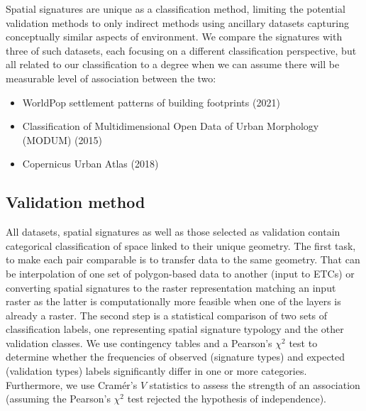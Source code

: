 Spatial signatures are unique as a classification method, limiting the potential
validation methods to only indirect methods using ancillary datasets capturing
conceptually similar aspects of environment. We compare the signatures with three of
such datasets, each focusing on a different classification perspective, but all related
to our classification to a degree when we can assume there will be measurable level of
association between the two:

\begin{itemize}
    \item WorldPop settlement patterns of building footprints (2021)\cite{jochem2021tools}
    \item Classification of Multidimensional Open Data of Urban Morphology (MODUM) (2015)\cite{alexiou2016}
    \item Copernicus Urban Atlas (2018)\cite{eea2018}
\end{itemize}


\subsection*{Validation method}
All datasets, spatial signatures as well as those selected as validation contain
categorical classification of space linked to their unique geometry. The first task, to
make each pair comparable is to transfer data to the same geometry. That can be
interpolation of one set of polygon-based data to another (input to ETCs) or converting
spatial signatures to the raster representation matching an input raster as the latter
is computationally more feasible when one of the layers is already a raster. The second
step is a statistical comparison of two sets of classification labels, one representing
spatial signature typology and the other validation classes. We use contingency tables
and a Pearson's $\chi^{2}$ test to determine whether the frequencies of observed
(signature types) and expected (validation types) labels significantly differ in one or
more categories. Furthermore, we use Cramér's $V$ statistics\cite{cramer2016mathematical} to assess the strength of
an association (assuming the Pearson's $\chi^{2}$ test rejected the hypothesis of
independence).

